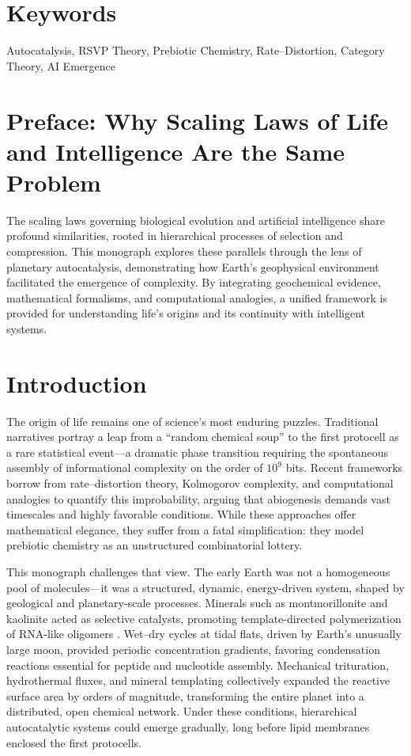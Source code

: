 \documentclass{book}
\begin{document}
\section*{Keywords}
Autocatalysis, RSVP Theory, Prebiotic Chemistry, Rate–Distortion, Category Theory, AI Emergence

\section*{Preface: Why Scaling Laws of Life and Intelligence Are the Same Problem}
The scaling laws governing biological evolution and artificial intelligence share profound similarities, rooted in hierarchical processes of selection and compression. This monograph explores these parallels through the lens of planetary autocatalysis, demonstrating how Earth's geophysical environment facilitated the emergence of complexity. By integrating geochemical evidence, mathematical formalisms, and computational analogies, a unified framework is provided for understanding life's origins and its continuity with intelligent systems.

\section{Introduction}
The origin of life remains one of science’s most enduring puzzles. Traditional narratives portray a leap from a “random chemical soup” to the first protocell as a rare statistical event—a dramatic phase transition requiring the spontaneous assembly of informational complexity on the order of $10^9$ bits. Recent frameworks borrow from rate–distortion theory, Kolmogorov complexity, and computational analogies to quantify this improbability, arguing that abiogenesis demands vast timescales and highly favorable conditions. While these approaches offer mathematical elegance, they suffer from a fatal simplification: they model prebiotic chemistry as an unstructured combinatorial lottery.

This monograph challenges that view. The early Earth was not a homogeneous pool of molecules—it was a structured, dynamic, energy-driven system, shaped by geological and planetary-scale processes. Minerals such as montmorillonite and kaolinite acted as selective catalysts, promoting template-directed polymerization of RNA-like oligomers \citep{hazen2005}. Wet–dry cycles at tidal flats, driven by Earth’s unusually large moon, provided periodic concentration gradients, favoring condensation reactions essential for peptide and nucleotide assembly. Mechanical trituration, hydrothermal fluxes, and mineral templating collectively expanded the reactive surface area by orders of magnitude, transforming the entire planet into a distributed, open chemical network. Under these conditions, hierarchical autocatalytic systems could emerge gradually, long before lipid membranes enclosed the first protocells.
\end{document}
